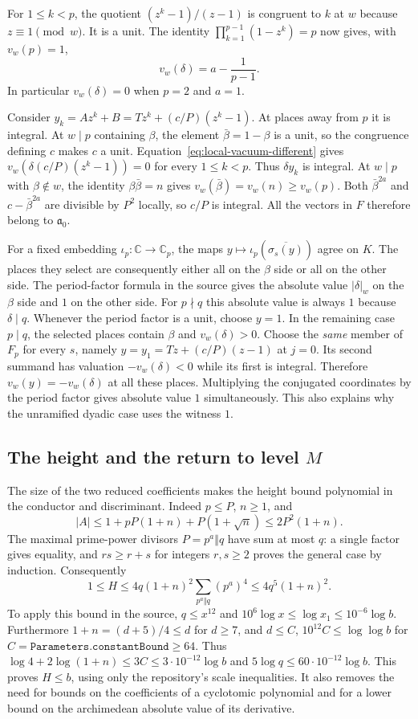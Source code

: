 \documentclass[11pt,letterpaper]{article}
\begin{document}
For $1\le k<p$, the quotient $(z^k-1)/(z-1)$ is congruent to $k$
at $w$ because $z\equiv1\pmod w$. It is a unit. The identity
$\prod_{k=1}^{p-1}(1-z^k)=p$ now gives, with $v_w(p)=1$,
\[
     v_w(\delta)=a-\frac1{p-1}.
\]
In particular $v_w(\delta)=0$ when $p=2$ and $a=1$.

Consider $y_k=Az^k+B=Tz^k+(c/P)(z^k-1)$.
At places away from $p$ it is integral. At $w\mid p$ containing
$\beta$, the element $\bar\beta=1-\beta$ is a unit, so the congruence defining $c$ makes $c$ a unit.
Equation~\eqref{eq:local-vacuum-different} gives
$v_w(\delta(c/P)(z^k-1))=0$ for every $1\leq k<p$.
Thus $\delta y_k$ is integral. At $w\mid p$ with $\beta\notin w$,
the identity $\beta\bar\beta=n$ gives
$v_w(\bar\beta)=v_w(n)\geq v_w(p)$. Both
$\bar\beta^{2a}$ and $c-\bar\beta^{2a}$ are divisible by $P^2$ locally,
so $c/P$ is integral.
All the vectors in $F$ therefore belong to $\mathfrak a_0$.

For a fixed embedding $\iota_p:\mathbb C\to\mathbb C_p$, the maps
$y\mapsto\iota_p(\overline{\sigma_s(y)})$ agree on $K$. The places
they select are consequently either all on the $\beta$ side or all on the
other side. The period-factor formula in the source gives the absolute
value $|\delta|_w$ on the $\beta$ side and $1$ on the other side.
For $p\nmid q$ this absolute value is always $1$ because $\delta\mid q$.
Whenever the period factor is a unit, choose $y=1$.
In the remaining case $p\mid q$, the selected places contain $\beta$ and
$v_w(\delta)>0$. Choose the \emph{same} member of $F_p$ for every $s$,
namely $y=y_1=Tz+(c/P)(z-1)$ at $j=0$.
Its second summand has valuation $-v_w(\delta)<0$ while its first is
integral. Therefore $v_w(y)=-v_w(\delta)$ at all these places. Multiplying
the conjugated coordinates by the period factor gives absolute value
$1$ simultaneously. This also explains why the unramified dyadic
case uses the witness $1$.

\subsection{The height and the return to level \texorpdfstring{$M$}{M}}
The size of the two reduced coefficients makes the height bound polynomial
in the conductor and discriminant. Indeed $p\le P$, $n\ge1$, and
\[
    |A|\le 1+pP(1+n)+P(1+\sqrt n)\le 2P^2(1+n).
\]
The maximal prime-power divisors $P=p^a\Vert q$ have sum at most $q$:
a single factor gives equality, and $rs\ge r+s$ for integers $r,s\ge2$
proves the general case by induction. Consequently
\[
     1\le H\le 4q(1+n)^2\sum_{p^a\Vert q}(p^a)^4
                \le 4q^5(1+n)^2.
\]
To apply this bound in the source, $q\le x^{12}$ and
$10^6\log x\le\log x_1\le10^{-6}\log b$.
Furthermore $1+n=(d+5)/4\le d$ for $d\ge7$, and
$d\le C$, $10^{12} C\le\log\log b$ for
$C=\texttt{Parameters.constantBound}\ge64$. Thus
$\log4+2\log(1+n)\le3C\le3\cdot 10^{-12}\log b$ and
$5\log q\le60\cdot 10^{-12}\log b$.
This proves $H\le b$, using only the repository's scale inequalities.
It also removes the need for bounds on the coefficients of a
cyclotomic polynomial and for a lower bound on the archimedean absolute
value of its derivative.
\end{document}
